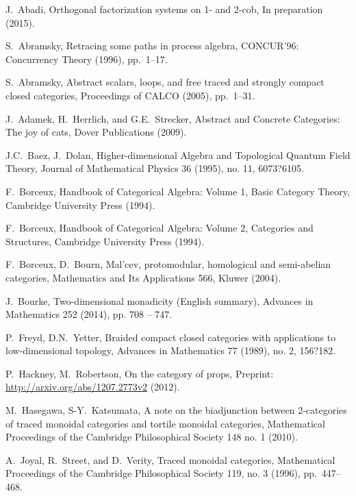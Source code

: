 \documentclass[11pt,oneside,article]{memoir}
\begin{document}
\begin{thebibliography}{XXX}

 J.~Abadi, Orthogonal factorization systems on 1- and 2-cob, In preparation (2015).

 S.~Abramsky, Retracing some paths in process algebra, CONCUR'96: Concurrency Theory (1996), pp.~1--17.

 S.~Abramsky, Abstract scalars, loops, and free traced and strongly compact closed categories, Proceedings of CALCO (2005), pp.~1--31.

 J.~Adamek, H.~Herrlich, and G.E.~Strecker, Abstract and Concrete Categories: The joy of cats, Dover Publications (2009).

 J.C.~Baez, J.~Dolan, Higher-dimensional Algebra and Topological Quantum Field Theory, Journal of Mathematical Physics 36 (1995), no. 11, 6073?6105.

F.~Borceux, Handbook of Categorical Algebra: Volume 1, Basic Category Theory, Cambridge University Press (1994).

 F.~Borceux, Handbook of Categorical Algebra: Volume 2, Categories and Structures, Cambridge University Press (1994).

 F.~Borceux, D.~Bourn, Mal'cev, protomodular, homological and semi-abelian categories, Mathematics
 and Its Applications 566, Kluwer (2004).

 J.~Bourke, Two-dimensional monadicity (English summary), Advances in Mathematics 252 (2014), pp. 708 -- 747.

 P.~Freyd, D.N.~Yetter, Braided compact closed categories with applications to low-dimensional topology,
Advances in Mathematics 77 (1989), no. 2, 156?182.

 P.~Hackney, M.~Robertson, On the category of props, Preprint: \url{http://arxiv.org/abs/1207.2773v2} (2012).

M.~Hasegawa, S-Y.~Katsumata, A note on the biadjunction between 2-categories of traced monoidal categories and tortile monoidal categories, Mathematical Proceedings of the Cambridge Philosophical Society 148 no. 1 (2010).

 A.~Joyal, R.~Street, and D.~Verity, Traced monoidal categories, Mathematical Proceedings of the Cambridge Philosophical Society 119, no. 3 (1996), pp.~447--468.


\end{thebibliography}
\end{document}
